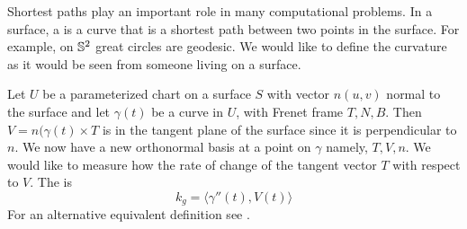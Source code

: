 Shortest paths play an important role in many computational problems.
In a surface, a  is a curve that is a shortest path
between two points in the surface. 
For example, on $\mathbb{S}^2$ great circles are geodesic.
We would like to define the curvature as it would be seen from
someone living on a surface.

Let $U$ be a parameterized chart on a surface $S$ with vector $n(u,v)$ normal
to the surface
and let $\gamma(t)$ be a curve in $U$, with Frenet frame $T,N,B$.
Then $V=n(\gamma(t)\times T$ is in the tangent plane of the surface since
it is perpendicular to $n$. We now have a new orthonormal basis at a point on $\gamma$
namely, $T,V,n$. 
We would like to measure how the rate of change of the tangent vector $T$ with respect to $V$.
The  is  
\begin{equation} \label{eqn:geodesic}
	k_g=\langle \gamma''(t),V(t)\rangle
\end{equation}
For an alternative equivalent definition see \cite{doc76}.



